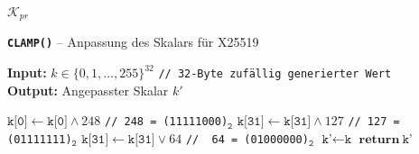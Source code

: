 
\begin{frame}{$\mathcal{K}_{pr}$}
    \begin{algorithm}[H]
        \caption{\textbf{\texttt{CLAMP()}} – Anpassung des Skalars für X25519}
        \label{alg:clamp}
        
        \textbf{Input:} $k \in \{0,1,\dots,255\}^{32}$ \hfill \texttt{// 32-Byte zufällig generierter Wert}\\
        \textbf{Output:} Angepasster Skalar $k'$
        
        \begin{algorithmic}[1]  
            \State \hspace{0.5cm} $\texttt{k{[}0{]}} \gets \texttt{k{[}0{]}} \land 248$ \hfill \texttt{// 248 = (11111000)$_\texttt{2}$}
            \State \hspace{0.5cm} $\texttt{k{[}31{]}} \gets \texttt{k{[}31{]}} \land 127$ \hfill \texttt{// 127 = (01111111)$_\texttt{2}$}
            \State \hspace{0.5cm} $\texttt{k{[}31{]}} \gets \texttt{k{[}31{]}} \lor 64$ \hfill \texttt{// \ 64 = (01000000)$_\texttt{2}$}
            \State \hspace{0.5cm} $\texttt{k'} \gets \texttt{k}$
            \State \hspace{0.5cm} $\textbf{return} \ \texttt{k'}$
        \end{algorithmic}
    \end{algorithm}
\end{frame}

